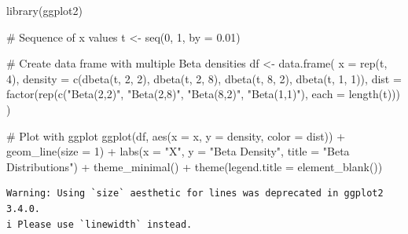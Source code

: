 \documentclass[
  letterpaper,
  DIV=11,
  numbers=noendperiod]{scrreprt}
\newenvironment{Shaded}{\begin{snugshade}}{\end{snugshade}}
\newcommand{\AttributeTok}[1]{\textcolor[rgb]{0.40,0.45,0.13}{#1}}
\newcommand{\CommentTok}[1]{\textcolor[rgb]{0.37,0.37,0.37}{#1}}
\newcommand{\DecValTok}[1]{\textcolor[rgb]{0.68,0.00,0.00}{#1}}
\newcommand{\FloatTok}[1]{\textcolor[rgb]{0.68,0.00,0.00}{#1}}
\newcommand{\FunctionTok}[1]{\textcolor[rgb]{0.28,0.35,0.67}{#1}}
\newcommand{\NormalTok}[1]{\textcolor[rgb]{0.00,0.23,0.31}{#1}}
\newcommand{\OtherTok}[1]{\textcolor[rgb]{0.00,0.23,0.31}{#1}}
\newcommand{\SpecialCharTok}[1]{\textcolor[rgb]{0.37,0.37,0.37}{#1}}
\newcommand{\StringTok}[1]{\textcolor[rgb]{0.13,0.47,0.30}{#1}}
\begin{document}
\begin{Shaded}
\begin{Highlighting}[]
\FunctionTok{library}\NormalTok{(ggplot2)}

\CommentTok{\# Sequence of x values}
\NormalTok{t }\OtherTok{\textless{}{-}} \FunctionTok{seq}\NormalTok{(}\DecValTok{0}\NormalTok{, }\DecValTok{1}\NormalTok{, }\AttributeTok{by =} \FloatTok{0.01}\NormalTok{)}

\CommentTok{\# Create data frame with multiple Beta densities}
\NormalTok{df }\OtherTok{\textless{}{-}} \FunctionTok{data.frame}\NormalTok{(}
  \AttributeTok{x =} \FunctionTok{rep}\NormalTok{(t, }\DecValTok{4}\NormalTok{),}
  \AttributeTok{density =} \FunctionTok{c}\NormalTok{(}\FunctionTok{dbeta}\NormalTok{(t, }\DecValTok{2}\NormalTok{, }\DecValTok{2}\NormalTok{),}
              \FunctionTok{dbeta}\NormalTok{(t, }\DecValTok{2}\NormalTok{, }\DecValTok{8}\NormalTok{),}
              \FunctionTok{dbeta}\NormalTok{(t, }\DecValTok{8}\NormalTok{, }\DecValTok{2}\NormalTok{),}
              \FunctionTok{dbeta}\NormalTok{(t, }\DecValTok{1}\NormalTok{, }\DecValTok{1}\NormalTok{)),}
  \AttributeTok{dist =} \FunctionTok{factor}\NormalTok{(}\FunctionTok{rep}\NormalTok{(}\FunctionTok{c}\NormalTok{(}\StringTok{"Beta(2,2)"}\NormalTok{, }\StringTok{"Beta(2,8)"}\NormalTok{, }\StringTok{"Beta(8,2)"}\NormalTok{, }\StringTok{"Beta(1,1)"}\NormalTok{),}
                    \AttributeTok{each =} \FunctionTok{length}\NormalTok{(t)))}
\NormalTok{)}

\CommentTok{\# Plot with ggplot}
\FunctionTok{ggplot}\NormalTok{(df, }\FunctionTok{aes}\NormalTok{(}\AttributeTok{x =}\NormalTok{ x, }\AttributeTok{y =}\NormalTok{ density, }\AttributeTok{color =}\NormalTok{ dist)) }\SpecialCharTok{+}
  \FunctionTok{geom\_line}\NormalTok{(}\AttributeTok{size =} \DecValTok{1}\NormalTok{) }\SpecialCharTok{+}
  \FunctionTok{labs}\NormalTok{(}\AttributeTok{x =} \StringTok{"X"}\NormalTok{, }\AttributeTok{y =} \StringTok{"Beta Density"}\NormalTok{, }\AttributeTok{title =} \StringTok{"Beta Distributions"}\NormalTok{) }\SpecialCharTok{+}
  \FunctionTok{theme\_minimal}\NormalTok{() }\SpecialCharTok{+}
  \FunctionTok{theme}\NormalTok{(}\AttributeTok{legend.title =} \FunctionTok{element\_blank}\NormalTok{())}
\end{Highlighting}
\end{Shaded}

\begin{verbatim}
Warning: Using `size` aesthetic for lines was deprecated in ggplot2 3.4.0.
i Please use `linewidth` instead.
\end{verbatim}
\end{document}
